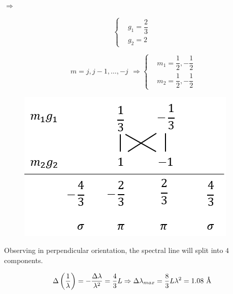 \documentclass{article}
\begin{document}
$\Rightarrow $

\begin{equation*}
  \left\{
  \begin{aligned}
    & g_1 = \dfrac{2}{3}  \\
    & g_2 = 2
  \end{aligned}
  \right.
\end{equation*}

\begin{equation*}
  \begin{aligned}
    m = j, j - 1, \dots, -j   
  \end{aligned}
  \Rightarrow
  \left\{
  \begin{aligned}
    & m_1 = \dfrac{1}{2}, - \dfrac{1}{2}   \\
    & m_2 = \dfrac{1}{2}, - \dfrac{1}{2}  
  \end{aligned}
  \right.
\end{equation*}

\begin{figure}[H]
  \centering
  \includegraphics[width=0.4\linewidth]{figures/Problem61}
  \label{fig:}
\end{figure}

Observing in perpendicular orientation, the spectral line will split into $4$ components.

\begin{equation*}
  \begin{aligned}
    \Delta \left( \dfrac{1}{\lambda}  \right) = - \dfrac{\Delta \lambda}{\lambda^2} = \dfrac{4}{3} L \Rightarrow \Delta \lambda_{max} = \dfrac{8}{3} L \lambda^2 = 1.08 \  \text{\normalfont\AA}
  \end{aligned}
\end{equation*}
\end{document}
